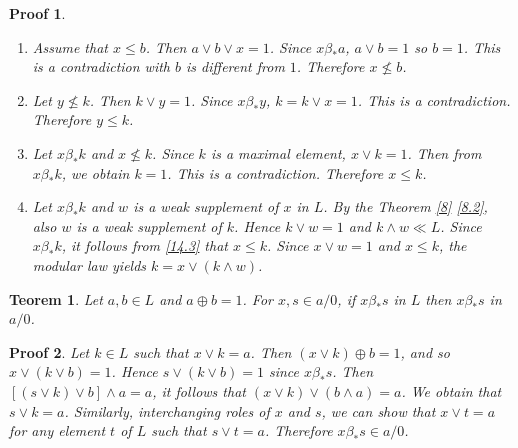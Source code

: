 \documentclass[a4paper,12pt]{article}
\numberwithin{equation}{section}
\theoremstyle{italik}
\newtheorem{teorem}{Teorem}[section]
\newtheorem*{ispat}{Proof}
\begin{document}
\begin{ispat}
    \begin{enumerate}
        \item
            Assume that $ x \leq b $. Then $ a \vee b \vee x = 1 $. Since $ x \beta_* a $, $ a \vee b = 1 $ so $ b = 1 $. 
            This is a contradiction with $ b $ is different from $ 1 $. 
            Therefore $ x \not\le b $.
        \item
            Let $ y \not\le k $. Then $ k \vee y = 1 $. Since $ x \beta_* y $, $ k = k \vee x = 1 $. This is a contradiction. 
            Therefore $ y \leq k $.
        \item
            Let $ x \beta_* k $ and $ x \not\le k $. Since $ k $ is a maximal element, $ x \vee k = 1 $. Then from $ x \beta_* k $, 
            we obtain $ k = 1 $. This is a contradiction. Therefore $ x \leq k $.
        \item
            Let $ x \beta_* k $ and $ w $ is a weak supplement of $ x $ in $ L $. By the Theorem \ref{8} \ref{8.2}, 
            also $ w $ is a weak supplement of $ k $. Hence $ k \vee w = 1 $ and $ k \wedge w \ll L $. 
            Since $ x \beta_* k $, it follows from \ref{14.3} that $ x \leq k $. Since $ x \vee w = 1 $ 
            and $ x \leq k $, the modular law yields $ k = x \vee ( k \wedge w ) $.
    \end{enumerate}
\end{ispat}


\begin{teorem}\label{15}
    Let $ a, b \in L $ and $ a \oplus b = 1 $. For $ x,s \in a/0 $, if $ x \beta_* s $ in $ L $ then $ x \beta_* s $ in $ a/0 $.
\end{teorem}

\begin{ispat}
    Let $ k \in L $ such that $ x \vee k = a $. Then $ (x \vee k ) \oplus b = 1 $, and so $ x \vee ( k \vee b ) = 1 $. 
    Hence $ s \vee ( k \vee b ) = 1 $ since $ x \beta_* s $. Then $ \left[ (s \vee k ) \vee b \right] \wedge a = a $, 
    it follows that $ ( x \vee k ) \vee ( b \wedge a ) = a $. We obtain that $ s \vee k = a $. Similarly, interchanging 
    roles of $ x $ and $ s $, we can show that $ x \vee t = a $ for any element $ t $ of $ L $ such that $ s \vee t = a $. 
    Therefore $ x \beta_* s \in a/0 $.
\end{ispat}
\end{document}
